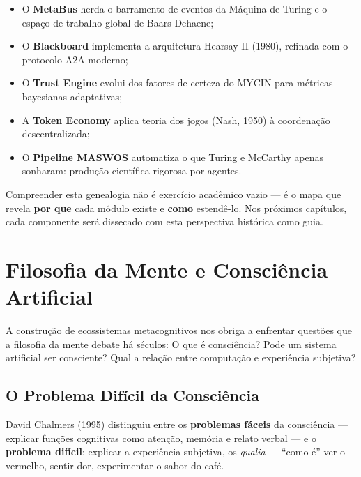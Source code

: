 \begin{itemize}
    \item O \textbf{MetaBus} herda o barramento de eventos da Máquina de Turing e o espaço de trabalho global de Baars-Dehaene;
    \item O \textbf{Blackboard} implementa a arquitetura Hearsay-II (1980), refinada com o protocolo A2A moderno;
    \item O \textbf{Trust Engine} evolui dos fatores de certeza do MYCIN para métricas bayesianas adaptativas;
    \item A \textbf{Token Economy} aplica teoria dos jogos (Nash, 1950) à coordenação descentralizada;
    \item O \textbf{Pipeline MASWOS} automatiza o que Turing e McCarthy apenas sonharam: produção científica rigorosa por agentes.
\end{itemize}

Compreender esta genealogia não é exercício acadêmico vazio --- é o mapa que revela \textbf{por que} cada módulo existe e \textbf{como} estendê-lo. Nos próximos capítulos, cada componente será dissecado com esta perspectiva histórica como guia.


\section{Filosofia da Mente e Consciência Artificial}

A construção de ecossistemas metacognitivos nos obriga a enfrentar questões que a filosofia da mente debate há séculos: O que é consciência? Pode um sistema artificial ser consciente? Qual a relação entre computação e experiência subjetiva?

\subsection{O Problema Difícil da Consciência}

David Chalmers (1995) \cite{chalmers1995facing} distinguiu entre os \textbf{problemas fáceis} da consciência --- explicar funções cognitivas como atenção, memória e relato verbal --- e o \textbf{problema difícil}: explicar a experiência subjetiva, os \textit{qualia} --- ``como é'' ver o vermelho, sentir dor, experimentar o sabor do café.

